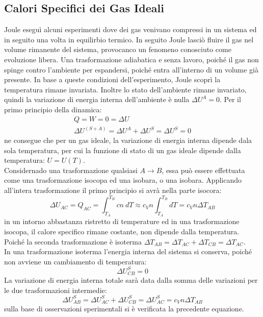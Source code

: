 \documentclass{article}
\numberwithin{equation}{subsection}
\begin{document}
\subsection{Calori Specifici dei Gas Ideali}
Joule eseguì alcuni esperimenti dove dei gas venivano compressi in un sistema ed in seguito una volta in equilirbio termico. In seguito Joule 
lasciò fluire il gas nel volume rimanente del sistema, provocanco un fenomeno conosciuto come evoluzione libera. Una trasformazione adiabatica 
e senza lavoro, poiché il gas non spinge contro l'ambiente per espandersi, poiché entra all'interno di un volume già presente. 
In base a queste condizioni dell'esperimento, Joule scoprì la temperatura rimane invariata. Inoltre
lo stato dell'ambiente rimane invariato, quindi la variazione 
di energia interna dell'ambiente è nulla $\Delta U^A=0$. Per 
il primo principio della dinamica: 
\begin{gather}
    Q=W=0=\Delta U\\
    \Delta U^{(S+A)}=\Delta U^A+\Delta U^S=\Delta U^S=0
\end{gather}
ne consegue che per un gas ideale, la variazione di energia 
interna dipende dala sola temperatura, per cui la funzione di 
stato di un gas ideale dipende dalla temperatura: $U=U(T)$.\\
Considernado una trasformazione qualsiasi $A\to B$, essa può essere 
effettuata come una trasformazione isocopa ed una isobara, 
o una isobara. Applicando all'intera trasformazione il primo 
principio si avrà nella parte isocora:
\begin{equation}
    \Delta U_{AC}=Q_{AC}=\int_{T_A}^{T_B}cn\:dT\approx c_Vn\int_{T_A}^{T_B}dT=c_Vn\Delta T_{AB}
\end{equation}
in un intorno abbastanza ristretto di temperature ed in una 
trasformazione isocopa, il calore specifico rimane costante, 
non dipende dalla temperatura. Poiché la seconda trasformazione 
è isoterma $\Delta T_{AB}=\Delta T_{AC}+\Delta T_{CB}=\Delta T_{AC}$. \\
In una trasformazione isoterma l'energia interna del sistema 
si conserva, poiché non avviene un cambiamento di temperatura: 
\begin{equation}
    \Delta U_{CB}^S=0
\end{equation}
La variazione di energia interna totale sarà data dalla somma 
delle variazioni per le due trasformazioni intermedie:
\begin{equation}
    \Delta U^S_{AB}=\Delta U^S_{AC}+\Delta U^S_{CB}=\Delta U^S_{AC}=c_Vn\Delta T_{AB}
\end{equation}
sulla base di osservazioni sperimentali si è verificata la 
precedente equazione.
\end{document}
